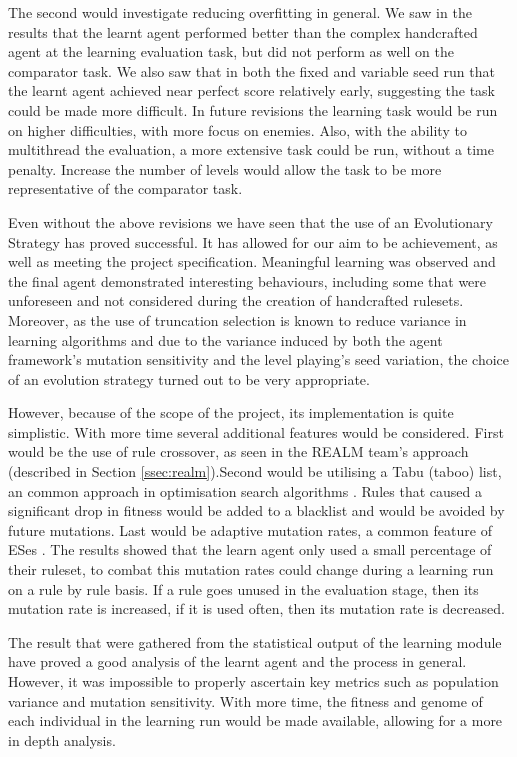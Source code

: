 The second would investigate reducing overfitting in general. We saw in the results that the learnt agent performed better than the complex handcrafted agent at the learning evaluation task, but did not perform as well on the comparator task. We also saw that in both the fixed and variable seed run that the learnt agent achieved near perfect score relatively early, suggesting the task could be made more difficult. In future revisions the learning task would be run on higher difficulties, with more focus on enemies. Also, with the ability to multithread the evaluation, a more extensive task could be run, without a time penalty. Increase the number of levels would allow the task to be more representative of the comparator task.

\vspace{\baselineskip}

Even without the above revisions we have seen that the use of an Evolutionary Strategy has proved successful. It has allowed for our aim to be achievement, as well as meeting the project specification. Meaningful learning was observed and the final agent demonstrated interesting behaviours, including some that were unforeseen and not considered during the creation of handcrafted rulesets. Moreover, as the use of truncation selection is known to reduce variance in learning algorithms \cite[s.~3.8.3]{geatbx} and due to the variance induced by both the agent framework's mutation sensitivity and the level playing's seed variation, the choice of an evolution strategy turned out to be very appropriate.

However, because of the scope of the project, its implementation is quite simplistic. With more time several additional features would be considered. First would be the use of rule crossover, as seen in the REALM team's approach (described in Section \ref{ssec:realm}).Second would be utilising a Tabu (taboo) list, an common approach in optimisation search algorithms \cite{tabu}. Rules that caused a significant drop in fitness would be added to a blacklist and would be avoided by future mutations. Last would be adaptive mutation rates, a common feature of ESes \cite[s.~4]{es-book}. The results showed that the learn agent only used a small percentage of their ruleset, to combat this mutation rates could change during a learning run on a rule by rule basis. If a rule goes unused in the evaluation stage, then its mutation rate is increased, if it is used often, then its mutation rate is decreased.

The result that were gathered from the statistical output of the learning module have proved a good analysis of the learnt agent and the process in general. However, it was impossible to properly ascertain key metrics such as population variance and mutation sensitivity. With more time, the fitness and genome of each individual in the learning run would be made available, allowing for a more in depth analysis.


